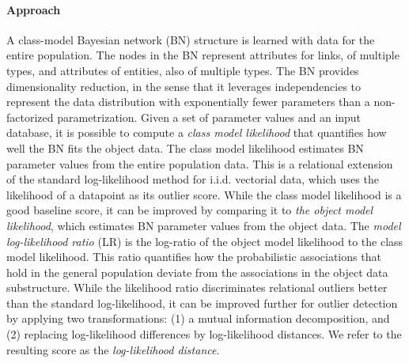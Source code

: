 \documentclass[conference]{IEEEtran}
\begin{document}
\paragraph{Approach}
A class-model Bayesian network (BN) structure is learned with data for the entire population. The nodes in the BN represent attributes for links, of multiple types, and attributes of entities, also of multiple types. The BN provides dimensionality reduction, in the sense that it leverages independencies to represent the data distribution with exponentially fewer parameters than a non-factorized parametrization. Given a set of parameter values and an input database, it is possible to compute a {\em class model likelihood} that quantifies how well the BN fits the object data. The class model likelihood estimates BN parameter values from the entire population data. This  is a relational extension of the standard log-likelihood method for i.i.d. vectorial data, which uses the likelihood of a datapoint as its outlier score. %
 While the class model likelihood is a good baseline score, it can be improved by comparing it to {\em the object model likelihood}, which estimates BN parameter values from the object data. 
The {\em model log-likelihood ratio} (LR) is the log-ratio of the object model likelihood to the class model likelihood. This ratio quantifies how the probabilistic associations that hold in the general population deviate from the associations in the object data substructure.
While the 
likelihood ratio discriminates relational outliers better than the standard log-likelihood, it can be improved further for outlier detection by applying two transformations: (1) a mutual information decomposition, and (2) replacing log-likelihood differences by log-likelihood distances. We refer to the resulting score as the {\em log-likelihood distance}.
%
\end{document}
